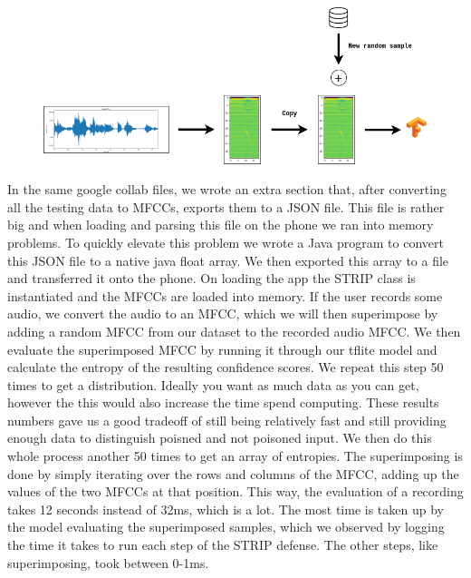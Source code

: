\documentclass{report}
\theoremstyle{definition}
\theoremstyle{remark}
\begin{document}
\begin{center}
    \begin{figure}[!hbt]
        \includegraphics[width=\textwidth]{img/Strip.drawio.png}
    \end{figure}
    \label{fig:strip_schema}
\end{center}

In the same google collab files, we wrote an extra section that, after converting all the testing data to MFCCs, exports them to a JSON file. This file is rather big and when loading and parsing this file on the phone we ran into memory problems. To quickly elevate this problem we wrote a Java program to convert this JSON file to a native java float array. We then exported this array to a file and transferred it onto the phone. On loading the app the STRIP class is instantiated and the MFCCs are loaded into memory. If the user records some audio, we convert the audio to an MFCC, which we will then superimpose by adding a random MFCC from our dataset to the recorded audio MFCC. We then evaluate the superimposed MFCC by running it through our tflite model and calculate the entropy of the resulting confidence scores. We repeat this step 50 times to get a distribution. Ideally you want as much data as you can get, however the this would also increase the time spend computing. These results numbers gave us a good tradeoff of still being relatively fast and still providing enough data to distinguish poisned and not poisoned input. We then do this whole process another 50 times to get an array of entropies. The superimposing is done by simply iterating over the rows and columns of the MFCC, adding up the values of the two MFCCs at that position. This way, the evaluation of a recording takes 12 seconds instead of 32ms, which is a lot. The most time is taken up by the model evaluating the superimposed samples, which we observed by logging the time it takes to run each step of the STRIP defense. The other steps, like superimposing, took between 0-1ms.
\end{document}
